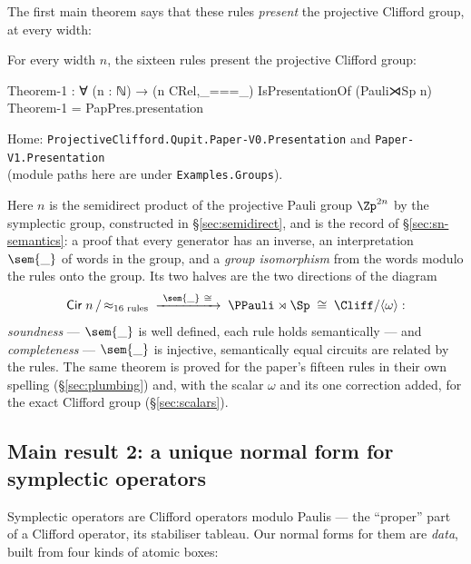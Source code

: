 The first main theorem says that these rules \emph{present} the
projective Clifford group, at every width:

\begin{theorem}\label{thm:main}
For every width $n$, the sixteen rules present the projective Clifford
group:
\begin{code}
Theorem-1 : ∀ (n : ℕ) → (n CRel,_===_) IsPresentationOf (Pauli⋊Sp n)
Theorem-1 = PapPres.presentation
\end{code}
\noindent Home: \texttt{ProjectiveClifford.Qupit.Paper-V0.Presentation}
and \texttt{Paper-V1.Presentation}\\
(module paths here are under \texttt{Examples.Groups}).
\end{theorem}

Here \;$n$ is the semidirect product of the projective
Pauli group $\Zp^{2n}$ by the symplectic group, constructed in
\S\ref{sec:semidirect}, and  is the record
of \S\ref{sec:sn-semantics}: a proof that every generator has an
inverse, an interpretation $\sem{\_}$ of words in the group, and a
\emph{group isomorphism} from the words modulo the rules onto the group.
Its two halves are the two directions of the diagram
\[
  \mathsf{Cir}\;n \,/\, {\approx_{\text{16 rules}}}
  \;\xrightarrow{\ \sem{\_}\ \cong\ }\;
  \PPauli \rtimes \Sp \;\cong\; \Cliff/\langle\omega\rangle :
\]
\emph{soundness} --- $\sem{\_}$ is well defined, each rule holds
semantically --- and \emph{completeness} --- $\sem{\_}$ is injective,
semantically equal circuits are related by the rules.  The same theorem
is proved for the paper's fifteen rules in their own spelling
(\S\ref{sec:plumbing}) and, with the scalar $\omega$ and its one
correction added, for the exact Clifford group (\S\ref{sec:scalars}).

\subsection{Main result 2: a unique normal form for symplectic operators}

Symplectic operators are Clifford operators modulo Paulis --- the
``proper'' part of a Clifford operator, its stabiliser tableau.  Our
normal forms for them are \emph{data}, built from four kinds of atomic
boxes:

